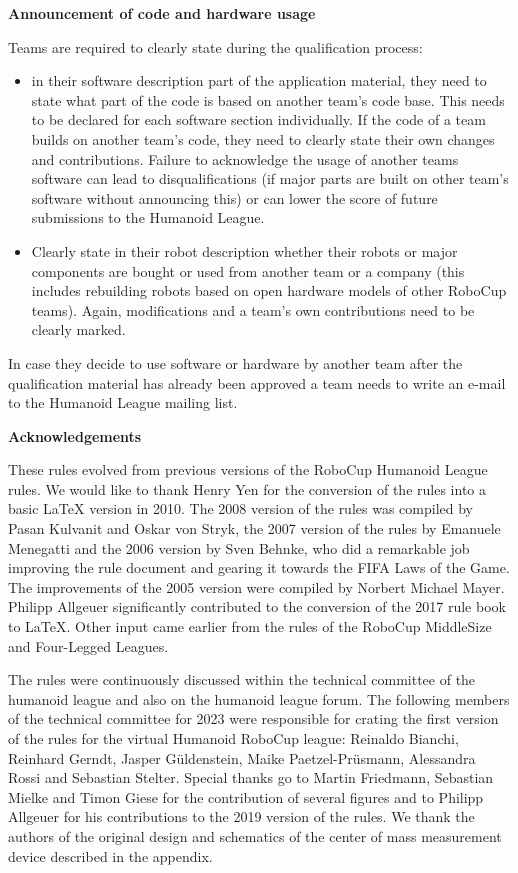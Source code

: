 \bigskip

      {\bfseries Announcement of code and hardware usage}
      
      \headlinebox
      
      Teams are required to clearly state during the qualification process:

      \bigskip

      \begin{itemize}
      \item in their software description part of the application material, they need to state what part of the code is based on another team's code base. This needs to be declared for each software section individually. If the code of a team builds on another team's code, they need to clearly state their own changes and contributions. Failure to acknowledge the usage of another teams software can lead to disqualifications (if major parts are built on other team's software without announcing this) or can lower the score of future submissions to the Humanoid League.
      \item Clearly state in their robot description whether their robots or major components are bought or used from another team or a company (this includes rebuilding robots based on open hardware models of other RoboCup teams). Again, modifications and a team's own contributions need to be clearly marked.
\end{itemize}
In case they decide to use software or hardware by another team after the qualification material has already been approved a team needs to write an e-mail to the Humanoid League mailing list.
      
      
\bigskip

{\bfseries Acknowledgements}

\headlinebox

These rules evolved from previous versions of the RoboCup Humanoid League rules. We would like to thank Henry Yen for the conversion of the rules into a basic LaTeX version in 2010. The 2008 version of the rules was compiled by Pasan Kulvanit and Oskar von Stryk, the 2007 version of the rules by Emanuele Menegatti and the 2006 version by Sven Behnke, who did a remarkable job improving the rule document and gearing it towards the FIFA Laws of the Game. The improvements of the 2005 version were compiled by Norbert Michael Mayer. Philipp Allgeuer significantly contributed to the conversion of the 2017 rule book to LaTeX.  Other input came earlier from the rules of the RoboCup MiddleSize and Four-Legged Leagues.

The rules were continuously discussed within the technical committee of the
humanoid league and also on the humanoid league forum.
The following members of the technical committee for 2023 were responsible for
crating the first version of the rules for the virtual Humanoid RoboCup league: Reinaldo Bianchi, Reinhard Gerndt, Jasper G\"{u}ldenstein, Maike Paetzel-Pr\"{u}smann, Alessandra Rossi and Sebastian Stelter.
Special thanks go to Martin Friedmann, Sebastian Mielke and Timon Giese for the
contribution of several figures and to Philipp Allgeuer for his contributions to
the 2019 version of the rules.
We thank the authors of the original design and schematics of the center
  of mass measurement device described in the appendix.
